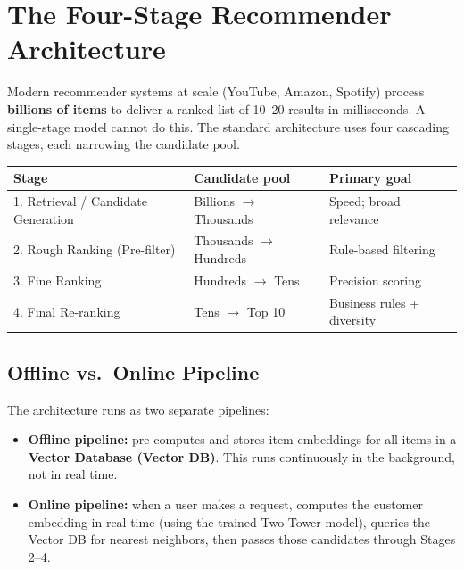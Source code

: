 \documentclass[11pt]{article}
\begin{document}
\section{The Four-Stage Recommender Architecture}

Modern recommender systems at scale (YouTube, Amazon, Spotify) process
\textbf{billions of items} to deliver a ranked list of 10--20 results in
milliseconds. A single-stage model cannot do this. The standard architecture
uses four cascading stages, each narrowing the candidate pool.

\begin{center}
\begin{tabular}{@{}lll@{}}
\toprule
\textbf{Stage} & \textbf{Candidate pool} & \textbf{Primary goal} \\
\midrule
1. Retrieval / Candidate Generation & Billions $\to$ Thousands & Speed; broad relevance \\
2. Rough Ranking (Pre-filter)        & Thousands $\to$ Hundreds & Rule-based filtering \\
3. Fine Ranking                      & Hundreds $\to$ Tens      & Precision scoring \\
4. Final Re-ranking                  & Tens $\to$ Top 10        & Business rules + diversity \\
\bottomrule
\end{tabular}
\end{center}

\subsection{Offline vs.\ Online Pipeline}
The architecture runs as two separate pipelines:

\begin{itemize}
    \item \textbf{Offline pipeline:} pre-computes and stores item embeddings
      for all items in a \textbf{Vector Database (Vector DB)}. This runs
      continuously in the background, not in real time.
    \item \textbf{Online pipeline:} when a user makes a request, computes
      the customer embedding in real time (using the trained Two-Tower
      model), queries the Vector DB for nearest neighbors, then passes
      those candidates through Stages 2--4.
\end{itemize}
\end{document}
